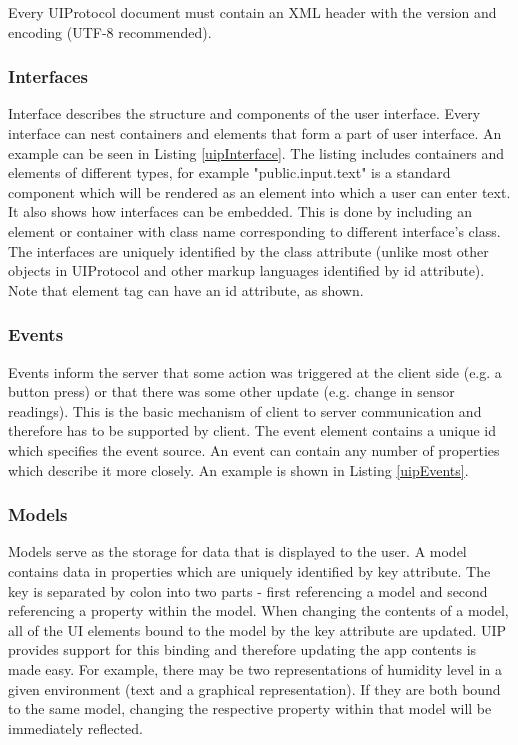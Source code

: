 

Every UIProtocol document must contain an XML header with the version and encoding (UTF-8 recommended).

\subsubsection{Interfaces}
Interface describes the structure and components of the user interface. Every interface can nest containers and elements that form a part of user interface. An example can be seen in Listing \ref{uipInterface}. The listing includes containers and elements of different types, for example "public.input.text" is a standard component which will be rendered as an element into which a user can enter text. It also shows how interfaces can be embedded. This is done by including an element or container with class name corresponding to different interface's class. The interfaces are uniquely identified by the class attribute (unlike most other objects in UIProtocol and other markup languages identified by id attribute). Note that element tag can have an id attribute, as shown.\\



\subsubsection{Events}
Events inform the server that some action was triggered at the client side (e.g. a button press) or that there was some other update (e.g. change in sensor readings). This is the basic mechanism of client to server communication and therefore has to be supported by client. The event element contains a unique id which specifies the event source. An event can contain any number of properties which describe it more closely. An example is shown in Listing \ref{uipEvents}.


\subsubsection{Models}
Models serve as the storage for data that is displayed to the user. A model contains data in properties which are uniquely identified by key attribute. The key is separated by colon into two parts - first referencing a model and second referencing a property within the model. When changing the contents of a model, all of the UI elements bound to the model by the key attribute are updated. UIP provides support for this binding and therefore updating the app contents is made easy. For example, there may be two representations of humidity level in a given environment (text and a graphical representation). If they are both bound to the same model, changing the respective property within that model will be immediately reflected.

